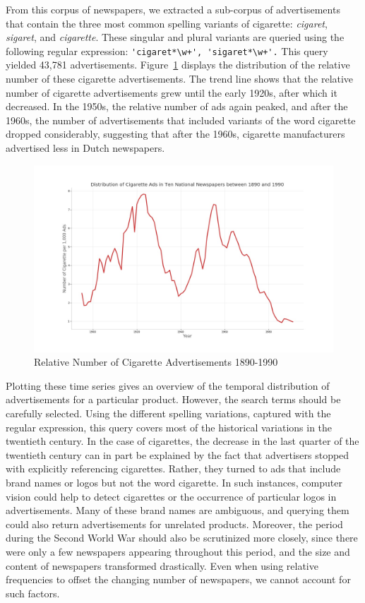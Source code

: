 \documentclass[USenglish]{article}
\begin{document}
From this corpus of newspapers, we extracted a sub-corpus of advertisements that contain the three most common spelling variants of cigarette: \textit{cigaret}, \textit{sigaret}, and \textit{cigarette}. These singular and plural variants are queried using the following regular expression: 
\verb/'cigaret*\w+', 'sigaret*\w+'./ This query yielded 43,781 advertisements. Figure~\ref{fig:cigarette_ad_curve} displays the distribution of the relative number of these cigarette advertisements. The trend line shows that the relative number of cigarette advertisements grew until the early 1920s, after which it decreased. In the 1950s, the relative number of ads again peaked, and after the 1960s, the number of advertisements that included variants of the word cigarette dropped considerably, suggesting that after the 1960s, cigarette manufacturers advertised less in Dutch newspapers.

\begin{figure}%
  \centering
  \includegraphics[width=.9\textwidth]{figures/cigarette_ads}%
  \caption{Relative Number of Cigarette Advertisements 1890-1990}%
  \label{fig:cigarette_ad_curve}%
\end{figure}

Plotting these time series gives an overview of the temporal distribution of advertisements for a particular product. However, the search terms should be carefully selected. Using the different spelling variations, captured with the regular expression, this query covers most of the historical variations in the twentieth century. In the case of cigarettes, the decrease in the last quarter of the twentieth century can in part be explained by the fact that advertisers stopped with explicitly referencing cigarettes. Rather, they turned to ads that include brand names or logos but not the word cigarette. In such instances, computer vision could help to detect cigarettes or the occurrence of particular logos in advertisements. Many of these brand names are ambiguous, and querying them could also return advertisements for unrelated products. 
%
Moreover, the period during the Second World War should also be scrutinized more closely, since there were only a few newspapers appearing throughout this period, and the size and content of newspapers transformed drastically. Even when using relative frequencies to offset the changing number of newspapers, we cannot account for such factors. 
\end{document}
